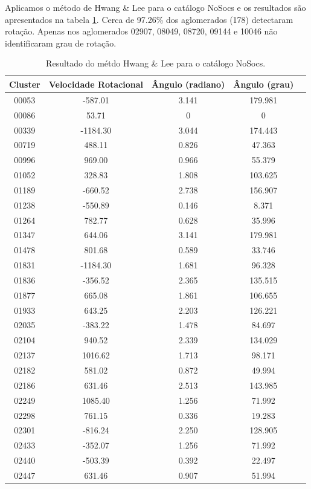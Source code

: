 Aplicamos o método de Hwang \& Lee para o catálogo NoSocs e os resultados são apresentados na tabela \ref{tab:nosocshwang}. Cerca de 97.26\% dos aglomerados (178) detectaram rotação. Apenas nos aglomerados 02907, 08049, 08720, 09144 e 10046 não identificaram grau de rotação.

{\small
\begin{longtable}{ccccc}
\caption{Resultado do métdo Hwang \& Lee para o catálogo NoSocs.}\label{tab:nosocshwang}
\\ \hline
\textbf{Cluster} & \textbf{Velocidade Rotacional} & \textbf{Ângulo (radiano)} & \textbf{Ângulo (grau)} \\ \hline
00053 & -587.01 & 3.141 & 179.981\\
00086 & 53.71 & 0 & 0\\
00339 & -1184.30 & 3.044 & 174.443\\
00719 & 488.11 & 0.826 & 47.363\\
00996 & 969.00 & 0.966 & 55.379\\
01052 & 328.83 & 1.808 & 103.625\\
01189 & -660.52 & 2.738 & 156.907\\
01238 & -550.89 & 0.146 & 8.371\\
01264 & 782.77 & 0.628 & 35.996\\
01347 & 644.06 & 3.141 & 179.981\\
01478 & 801.68 & 0.589 & 33.746\\
01831 & -1184.30 & 1.681 & 96.328\\
01836 & -356.52 & 2.365 & 135.515\\
01877 & 665.08 & 1.861 & 106.655\\
01933 & 643.25 & 2.203 & 126.221\\
02035 & -383.22 & 1.478 & 84.697\\
02104 & 940.52 & 2.339 & 134.029\\
02137 & 1016.62 & 1.713 & 98.171\\
02182 & 581.02 & 0.872 & 49.994\\
02186 & 631.46 & 2.513 & 143.985\\
02249 & 1085.40 & 1.256 & 71.992\\
02298 & 761.15 & 0.336 & 19.283\\
02301 & -816.24 & 2.250 & 128.905\\
02433 & -352.07 & 1.256 & 71.992\\
02440 & -503.39 & 0.392 & 22.497\\
02447 & 631.46 & 0.907 & 51.994\\

\end{longtable}}
